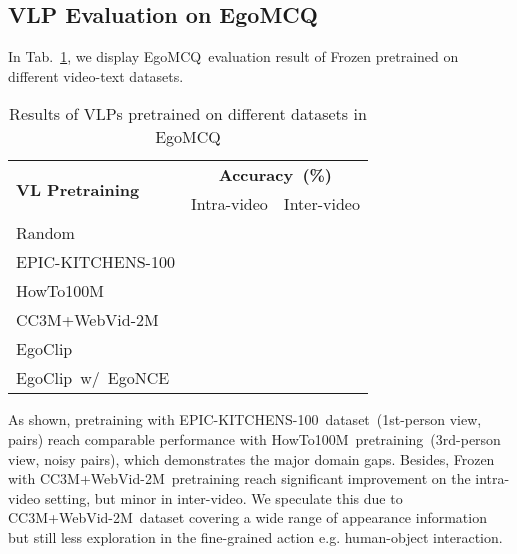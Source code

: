 \documentclass{article}
\newcommand{\dataset}{EgoClip}
\newcommand{\model}{EgoNCE\xspace}
\newcommand{\eval}{EgoMCQ}
\newcommand{\epic}{EPIC-KITCHENS-100}
\newcommand{\ccweb}{CC3M+WebVid-2M}
\newcommand{\howto}{HowTo100M}
\begin{document}
\subsection{VLP Evaluation on \eval}
In Tab.~\ref{egomcq_eval}, we display \eval~evaluation result of Frozen pretrained on different video-text datasets.
\begin{table}[htb]
\centering
\vspace{-1em}
\begin{tabular}{l|cc}
    \toprule[1pt] 
	\multicolumn{1}{l|}{\multirow{2}{*}{\textbf{VL Pretraining}}} &  \multicolumn{2}{c}{\textbf{Accuracy~(\%)}} \\
	 & Intra-video      & Inter-video       \\ \midrule[1pt] 
	Random &   &    \\ 	\midrule
	\epic &   &    \\
    \howto &   &    \\
	\ccweb  &  &    \\ \midrule
	\dataset &   &    \\
    \dataset~w/~\model  &   &    \\
	\bottomrule[1pt]
\end{tabular}
\vspace{0.4em}
\caption{Results of VLPs pretrained on different datasets in \eval}
\vspace{-2em}
\label{egomcq_eval}
\end{table} 
As shown, pretraining with \epic~dataset~(1st-person view,  pairs) reach comparable performance with \howto~pretraining~(3rd-person view,  noisy pairs), which demonstrates the major domain gaps. 
Besides, Frozen with \ccweb~pretraining reach significant improvement on the intra-video setting, but minor in inter-video. 
We speculate this due to \ccweb~dataset covering a wide range of appearance information but still less exploration in the fine-grained action e.g. human-object interaction.
\end{document}
